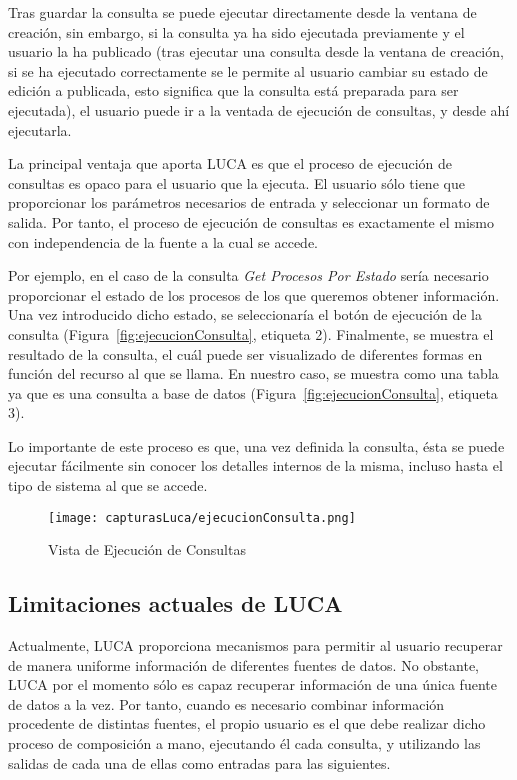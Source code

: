 Tras guardar la consulta se puede ejecutar directamente desde la ventana de creación, sin embargo, si la consulta ya ha sido ejecutada previamente y el usuario la ha publicado (tras ejecutar una consulta desde la ventana de creación, si se ha ejecutado correctamente se le permite al usuario cambiar su estado de edición a publicada, esto significa que la consulta está preparada para ser ejecutada), el usuario puede ir a la ventada de ejecución de consultas, y desde ahí ejecutarla.

La principal ventaja que aporta LUCA es que el proceso de ejecución de consultas es opaco para el usuario que la ejecuta. El usuario sólo tiene que proporcionar los parámetros necesarios de entrada y seleccionar un formato de salida. Por tanto, el proceso de ejecución de consultas es exactamente el mismo con independencia de la fuente a la cual se accede.

Por ejemplo, en el caso de la consulta \emph{Get Procesos Por Estado} sería necesario proporcionar el estado de los procesos de los que queremos obtener información. Una vez introducido dicho estado, se seleccionaría el botón de ejecución de la consulta (Figura~\ref{fig:ejecucionConsulta}, etiqueta 2). Finalmente, se muestra el resultado de la consulta, el cuál puede ser visualizado de diferentes formas en función del recurso al que se llama. En nuestro caso, se muestra como una tabla ya que es una consulta a base de datos (Figura~\ref{fig:ejecucionConsulta}, etiqueta 3).

Lo importante de este proceso es que, una vez definida la consulta, ésta se puede ejecutar fácilmente sin conocer los detalles internos de la misma, incluso hasta el tipo de sistema al que se accede.

	\begin{figure}[!tb]
		\centering
		\texttt{[image: capturasLuca/ejecucionConsulta.png]}
		\caption{Vista de Ejecución de Consultas}\label{fig:ejecucionConsultas}
	\end{figure}

\subsection{Limitaciones actuales de LUCA}

Actualmente, LUCA proporciona mecanismos para permitir al usuario recuperar de manera uniforme información de diferentes fuentes de datos. No obstante, LUCA por el momento sólo es capaz recuperar información de una única fuente de datos a la vez. Por tanto, cuando es necesario combinar información procedente de distintas fuentes, el propio usuario es el que debe realizar dicho proceso de composición a mano, ejecutando él cada consulta, y utilizando las salidas de cada una de ellas como entradas para las siguientes.


